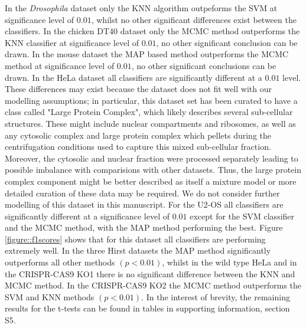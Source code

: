 \documentclass[12pt,english]{article}\usepackage[]{graphicx}\usepackage[]{color}
\begin{document}
In the \textit{Drosophila} dataset only the KNN algorithm outpeforms
the SVM at significance level of $0.01$, whilst no other significant
differences exist between the classifiers. In the chicken DT40 dataset
only the MCMC method outperforms the KNN classifier at significance
level of $0.01$, no other significant conclusion can be drawn. In the
mouse dataset the MAP based method outperforms the MCMC method at
significance level of $0.01$, no other significant conclusions can be
drawn. In the HeLa dataset all classifiers are significantly different
at a $0.01$ level. These differences may exist because the dataset does
not fit well with our modelling assumptions; in particular, this
dataset set has been curated to have a class called "Large Protein
Complex", which likely describes several sub-cellular
structures. These might include nuclear compartments and ribosomes, as
well as any cytosolic complex and large protein complex which pellets
during the centrifugation conditions used to capture this mixed
sub-cellular fraction. Moreover, the cytosolic and nuclear fraction
were processed separately leading to possible imbalance with
comparisions with other datasets. Thus, the large protein complex
component might be better described as itself a mixture model or more
detailed curation of these data may be required. We do not consider
further modelling of this dataset in this manuscript. For the U2-OS
all classifiers are significantly different at a significance level of
$0.01$ except for the SVM classifier and the MCMC method, with the MAP
method performing the best. Figure \ref{figure::f1scores} shows that
for this dataset all classifiers are performing extremely well. In the
three Hirst datasets the MAP method significantly outperforms all
other methods $(p < 0.01)$, whilst in the wild type HeLa and in the
CRISPR-CAS9 KO1 there is no significant difference between the KNN
and MCMC method. In the CRISPR-CAS9 KO2 the MCMC method outperforms
the SVM and KNN methods $(p < 0.01)$. In the interest of brevity, the
remaining results for the t-tests can be found in tables in supporting information, section S5.
\end{document}
